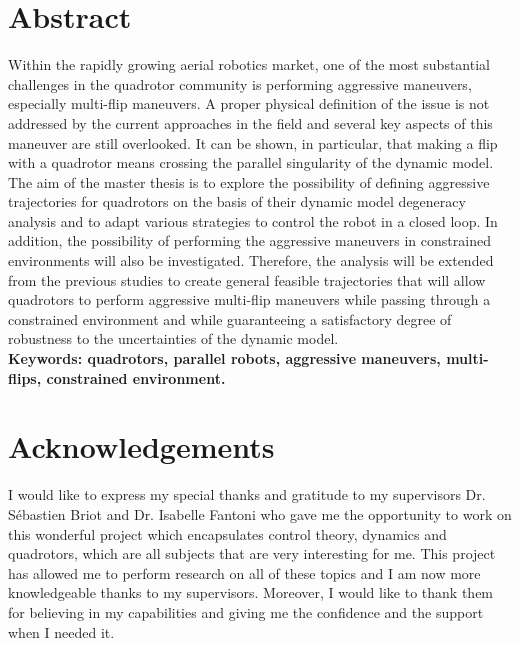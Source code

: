 \documentclass{thesisreport}
\begin{document}
   
 
  \section*{Abstract}
   
Within the rapidly growing aerial robotics market, one of the most substantial challenges in the quadrotor community is performing aggressive maneuvers, especially multi-flip maneuvers.  A proper physical definition of the issue is not addressed by the current approaches in the field and several key aspects of this maneuver are still overlooked.
It can be shown, in particular, that making a flip with a quadrotor means crossing the parallel singularity of the dynamic model. The aim of the master thesis is to explore the possibility of defining aggressive trajectories for quadrotors on the basis of their dynamic model degeneracy analysis and to adapt various strategies to control the robot in a closed loop. In addition, the possibility of performing the aggressive maneuvers in constrained environments will also be investigated.
Therefore, the analysis will be extended from the previous studies to create general feasible trajectories that will allow quadrotors to perform aggressive multi-flip maneuvers while passing through a constrained environment and while guaranteeing a satisfactory degree of robustness to the uncertainties of the dynamic model.\\

\textbf{Keywords: quadrotors, parallel robots, aggressive maneuvers, multi-flips, constrained environment. }
 
 
 \newpage
 
 \section*{Acknowledgements}
 
 I would like to express my special thanks and gratitude to my supervisors Dr. Sébastien Briot and Dr. Isabelle Fantoni who gave me the  opportunity to work on this wonderful project which encapsulates control theory, dynamics and quadrotors, which are all subjects that are very interesting for me. 
This project has allowed me to perform research on all of these topics and I am now more knowledgeable thanks to my supervisors. Moreover, I would like to thank them for believing in my capabilities and giving me the confidence and the support when I needed it. \\
\end{document}
